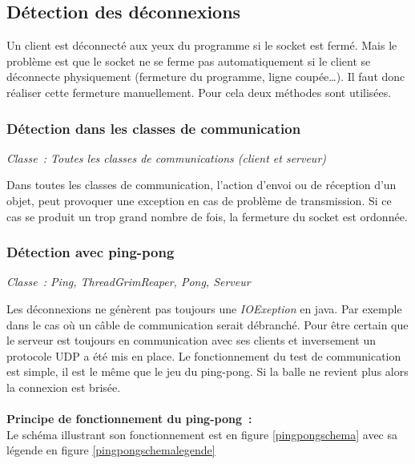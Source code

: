 \documentclass[a4paper, titlepage]{livret}
\begin{document}
  \subsection{Détection des déconnexions}
    Un client est déconnecté aux yeux du programme si le socket est fermé. Mais le problème est que le socket ne se ferme pas automatiquement si le client se déconnecte physiquement (fermeture du programme, ligne coupée…). Il faut donc réaliser cette fermeture manuellement. Pour cela deux méthodes sont utilisées.
    
  \subsubsection{Détection dans les classes de communication}
    \begin{center}
    \textit{Classe : Toutes les classes de communications (client et serveur)}
    \end{center}
      Dans toutes les classes de communication, l’action d’envoi ou de réception d’un objet, peut provoquer une exception en cas de problème de transmission. Si ce cas se produit un trop grand nombre de fois, la fermeture du socket est ordonnée.
    
    \subsubsection{Détection avec ping-pong}
    \begin{center}
    \textit{Classe : Ping, ThreadGrimReaper, Pong, Serveur}
    \end{center}
      Les déconnexions ne génèrent pas toujours une \textit{IOExeption} en java. Par exemple dans le cas où un câble de communication serait débranché. Pour être certain que le serveur est toujours en communication avec ses clients et inversement un protocole UDP a été mis en place. Le fonctionnement du test de communication est simple, il est le même que le jeu du ping-pong. Si la balle ne revient plus alors la connexion est brisée.
\\
\\
\textbf{Principe de fonctionnement du ping-pong :}
\\
Le schéma illustrant son fonctionnement est en figure \ref{pingpongschema} avec sa légende en figure \ref{pingpongschemalegende}
\end{document}
